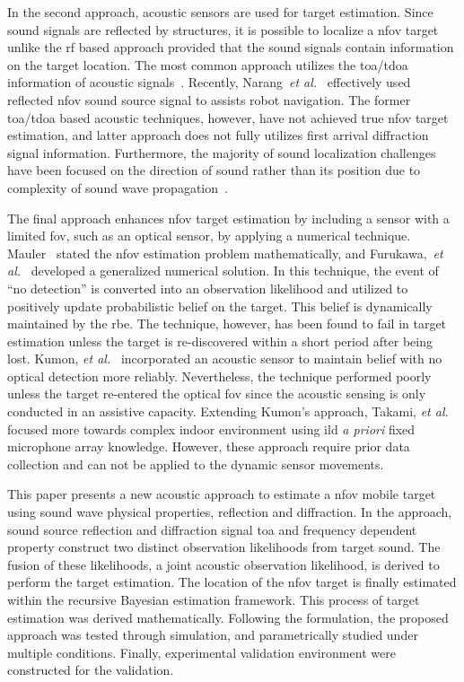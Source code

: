 \documentclass[letterpaper, 10 pt, conference]{ieeeconf}  %
\begin{document}
In the second approach, acoustic sensors are used for target estimation.  Since sound signals are reflected by structures, it is possible to localize a \gls{nfov} target unlike the \gls{rf} based approach provided that the sound signals contain information on the target location. The most common approach utilizes the \acrfull{toa}/\gls{tdoa} information of acoustic signals~\cite{hu2011simultaneous,ward2003particle,Mak2009}. Recently, Narang~{\it et al.}~\cite{narang2014auditory} effectively used reflected \gls{nfov} sound source signal to assists robot navigation.  The former \gls{toa}/\gls{tdoa} based acoustic techniques, however, have not achieved true \gls{nfov} target estimation, and latter approach does not fully utilizes first arrival diffraction signal information. Furthermore, the majority of sound localization challenges have been focused on the direction of sound rather than its position due to complexity of sound wave propagation~\cite{tamai2005three,sva12}.  

The final approach enhances \gls{nfov} target estimation by including a sensor with a limited \gls{fov}, such as an optical sensor, by applying a numerical technique. Mauler~\cite{mau03} stated the \gls{nfov} estimation problem mathematically, and Furukawa,~{\it et al.}~\cite{fur06,fur12} developed a generalized numerical solution.  In this technique, the event of ``no detection'' is converted into an observation likelihood and utilized to positively update probabilistic belief on the target. This belief is dynamically maintained by the \gls{rbe}.  The technique, however, has been found to fail in target estimation unless the target is re-discovered within a short period after being lost.  Kumon, {\it et al.}~\cite{kum13}  incorporated an acoustic sensor to maintain belief with no optical detection more reliably. Nevertheless, the technique performed poorly unless the target re-entered the optical \gls{fov} since the acoustic sensing is only conducted in an assistive capacity. Extending Kumon's approach, Takami, {\it et al.}~\cite{takami2015fsr} focused more towards complex indoor environment using \gls{ild} {\it a priori} fixed microphone array knowledge. However, these approach require prior data collection and can not be applied to the dynamic sensor movements.   

This paper presents a new acoustic approach to estimate a \gls{nfov} mobile target using sound wave physical properties, reflection and diffraction. In the approach, sound source reflection and diffraction signal \gls{toa} and frequency dependent property construct two distinct observation likelihoods from target sound. The fusion of these likelihoods, a joint acoustic observation likelihood, is derived to perform the target estimation. The location of the \gls{nfov} target is finally estimated within the recursive Bayesian estimation framework. This process of target estimation was derived mathematically. Following the formulation, the proposed approach was tested through simulation, and parametrically studied under multiple conditions. Finally, experimental validation environment were constructed for the validation.
\end{document}
